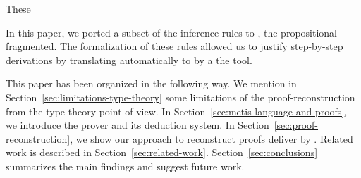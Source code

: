 \documentclass[../main.tex]{subfiles}
\begin{document}


 These




In this paper, we ported a subset of the \Metis inference rules to
\Agda, the propositional fragmented. The formalization of
these rules allowed us to justify step-by-step \Metis derivations by
translating automatically to \Agda by a the \Athena tool.


This paper has been organized in the following way.
We mention in Section~\ref{sec:limitations-type-theory}
some limitations of the proof-reconstruction from the type theory
point of view. In Section~\ref{sec:metis-language-and-proofs}, we introduce the
\Metis prover and its deduction system.
In Section~\ref{sec:proof-reconstruction}, we show our
approach to reconstruct proofs deliver by \Metis.
Related work is described in Section~\ref{sec:related-work}.
Section~\ref{sec:conclusions} summarizes the main findings and suggest future work.
\end{document}
